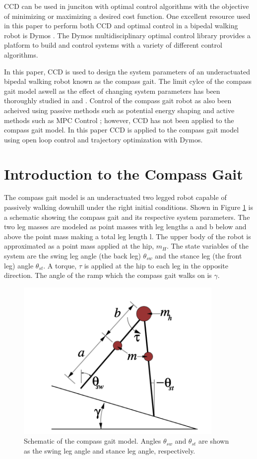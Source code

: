 \documentclass{./springer/svjour3}
\begin{document}
CCD can be used in junciton with optimal control algorithms with the objective of minimizing or maximizing a desired cost function. One 
excellent resource used in this paper to perform both CCD and optimal control in a bipedal walking robot is Dymos \cite{Falck2021}. The Dymos multidisciplinary optimal control library
provides a platform to build and control systems with a variety of different control algorithms.

%
In this paper, CCD is used to design the system parameters of an underactuated bipedal walking robot known as the compass gait. The limit cylce
of the compass gait model aswell as the effect of changing system parameters has been thoroughly studied 
in \cite{Goswami} and \cite{goswami:inria-00073701}. Control of the compass gait robot as also been acheived using passive methods such as potential energy shaping
\cite{Spong} and active methods such as MPC Control \cite{Kamath2009}; however, CCD has not been applied to the compass gait model.
In this paper CCD is applied to the compass gait model using open loop control and trajectory optimization with Dymos.

\section{Introduction to the Compass Gait}
The compass gait model is an underactuated two legged robot capable of passively walking downhill under the right initial conditions.
Shown in Figure \ref{fig:compassgaitmodel} is a schematic showing the compass gait and its respective system parameters. The two leg masses are modeled as
point masses with leg lengths a and b below and above the point mass making a total leg length l. The upper body of the robot is approximated as a point mass
applied at the hip, $m_H$. The state variables of the system are the swing leg angle (the back leg) $\theta_{sw}$ and the stance leg (the front leg) angle
$\theta_{st}$. A torque, $\tau$ is applied at the hip to each leg in the opposite direction. The angle of the ramp which the compass gait walks on is $\gamma$.

\begin{figure}[!h]
\centering
\includegraphics[width=10cm]{./figures/compassgaitmodel.png}
\caption{Schematic of the compass gait model. Angles $\theta_{sw}$ and $\theta_{st}$ are shown as the swing leg angle and stance leg angle, respectively.}
\label{fig:compassgaitmodel}
\end{figure}
\end{document}
